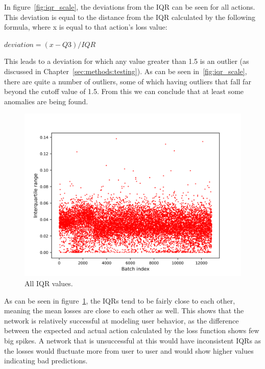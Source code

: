 In figure~\ref{fig:iqr_scale}, the deviations from the IQR can be seen for all actions. This deviation is equal to the distance from the IQR calculated by the following formula, where x is equal to that action's loss value:

\( deviation = (x - Q3) / IQR \)

This leads to a deviation for which any value greater than 1.5 is an outlier (as discussed in Chapter~\ref{sec:methods:testing}). As can be seen in~\ref{fig:iqr_scale}, there are quite a number of outliers, some of which having outliers that fall far beyond the cutoff value of 1.5. From this we can conclude that at least some anomalies are being found. 

\begin{figure}
	\begin{center}
		\includegraphics[scale=0.1]{evaluation/iqrs}
	\end{center}
	\caption{All IQR values.~\label{fig:iqrs}}
\end{figure}

As can be seen in figure~\ref{fig:iqrs}, the IQRs tend to be fairly close to each other, meaning the mean losses are close to each other as well. This shows that the network is relatively successful at modeling user behavior, as the difference between the expected and actual action calculated by the loss function shows few big spikes. A network that is unsuccessful at this would have inconsistent IQRs as the losses would fluctuate more from user to user and would show higher values indicating bad predictions.

